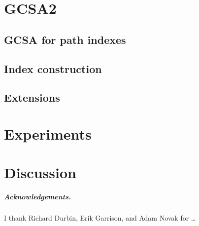 \documentclass[a4paper,UKenglish]{lipics-v2016}
\begin{document}
\section{GCSA2}

\subsection{GCSA for path indexes}

\subsection{Index construction}

\subsection{Extensions}


\section{Experiments}


\section{Discussion}


\subparagraph*{Acknowledgements.}

I thank Richard Durbin, Erik Garrison, and Adam Novak for \dots



\end{document}
